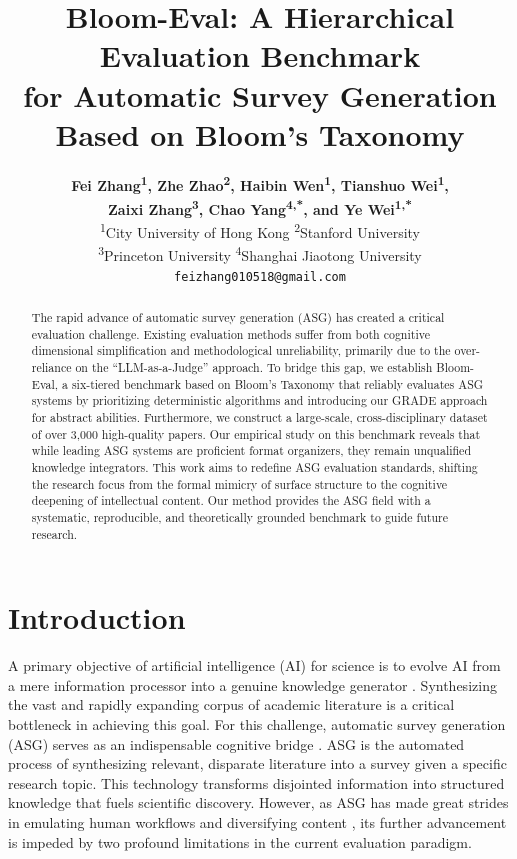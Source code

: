 \documentclass[11pt]{article}
\title{Bloom-Eval: A Hierarchical Evaluation Benchmark \\ for Automatic Survey Generation Based on Bloom's Taxonomy}
\author{
    \textbf{Fei Zhang\textsuperscript{1},
    Zhe Zhao\textsuperscript{2},
    Haibin Wen\textsuperscript{1},
    Tianshuo Wei\textsuperscript{1},}\\
    \textbf{Zaixi Zhang\textsuperscript{3},
    Chao Yang\textsuperscript{4,*}, and
    Ye Wei\textsuperscript{1,*}} \\
    \textsuperscript{1}City University of Hong Kong \quad
    \textsuperscript{2}Stanford University \\
    \textsuperscript{3}Princeton University \quad
    \textsuperscript{4}Shanghai Jiaotong University \\
    \texttt{feizhang010518@gmail.com}
}
\begin{document}
\maketitle
{\let\thefootnote\relax{}}
\begin{abstract}
The rapid advance of automatic survey generation (ASG) has created a critical evaluation challenge. Existing evaluation methods suffer from both cognitive dimensional simplification and methodological unreliability, primarily due to the over-reliance on the ``LLM-as-a-Judge'' approach. To bridge this gap, we establish Bloom-Eval, a six-tiered benchmark based on Bloom's Taxonomy that reliably evaluates ASG systems by prioritizing deterministic algorithms and introducing our GRADE approach for abstract abilities. Furthermore, we construct a large-scale, cross-disciplinary dataset of over 3,000 high-quality papers. Our empirical study on this benchmark reveals that while leading ASG systems are proficient format organizers, they remain unqualified knowledge integrators. This work aims to redefine ASG evaluation standards, shifting the research focus from the formal mimicry of surface structure to the cognitive deepening of intellectual content. Our method provides the ASG field with a systematic, reproducible, and theoretically grounded benchmark to guide future research.
\end{abstract}

\section{Introduction}
\label{sec:introduction}
A primary objective of artificial intelligence (AI) for science is to evolve AI from a mere information processor into a genuine knowledge generator \citep{lu2024AIScientist, li2024chain, yuan2025dolphin}. Synthesizing the vast and rapidly expanding corpus of academic literature is a critical bottleneck in achieving this goal. For this challenge, automatic survey generation (ASG) \citep{wang2024autosurvey} serves as an indispensable cognitive bridge \citep{hu2014automatic, chen2019automatic, sun2019automatic, hu2024hireview, zhu2023hierarchical}. ASG is the automated process of synthesizing relevant, disparate literature into a survey given a specific research topic. This technology transforms disjointed information into structured knowledge that fuels scientific discovery. However, as ASG has made great strides in emulating human workflows and diversifying content \citep{yan2025surveyforge, liang2025surveyx, wang2025llmmapreducev2}, its further advancement is impeded by two profound limitations in the current evaluation paradigm.
\end{document}
